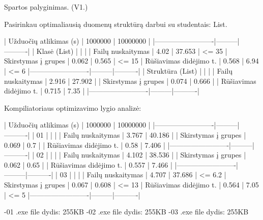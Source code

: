 Spartos palyginimas. (V1.) \begin{DoxyVerb}Pasirinkau optimaliausią duomenų struktūrą darbui su studentais: List.

| Užduočių atlikimas (s)  | 1000000 | 10000000 |
|-------------------------|---------|----------|
| Klasė (List)            |         |          |
| Failų nuskaitymas       |  4.02   |  37.653  | <= 35%
| Skirstymas į grupes     |  0.062  |  0.565   | <= 15%
| Rūšiavimas didėjimo t.  |  0.568  |  6.94    | <= 6%
|-------------------------|---------|----------|
| Struktūra (List)        |         |          |
| Failų nuskaitymas       |  2.916  |  27.902  |
| Skirstymas į grupes     |  0.074  |  0.666   |
| Rūšiavimas didėjimo t.  |  0.715  |  7.35    |
|-------------------------|---------|----------|
\end{DoxyVerb}
 Kompiliatoriaus optimizavimo lygio analizė\+: \begin{DoxyVerb}| Užduočių atlikimas (s)  | 1000000 | 10000000 |
|-------------------------|---------|----------|
| 01                      |         |          |
| Failų nuskaitymas       |  3.767  |  40.186  |
| Skirstymas į grupes     |  0.069  |  0.7     |
| Rūšiavimas didėjimo t.  |  0.58   |  7.406   |
|-------------------------|---------|----------|
| 02                      |         |          |
| Failų nuskaitymas       |  4.102  |  38.536  |
| Skirstymas į grupes     |  0.062  |  0.65    |
| Rūšiavimas didėjimo t.  |  0.557  |  7.466   |
|-------------------------|---------|----------|
| 03                      |         |          |
| Failų nuskaitymas       |  4.707  |  37.686  | <= 6.2%
| Skirstymas į grupes     |  0.067  |  0.608   | <= 13%
| Rūšiavimas didėjimo t.  |  0.564  |  7.05    | <= 5%
|-------------------------|---------|----------|

-01 .exe file dydis: 255KB
-02 .exe file dydis: 255KB
-03 .exe file dydis: 255KB
\end{DoxyVerb}


